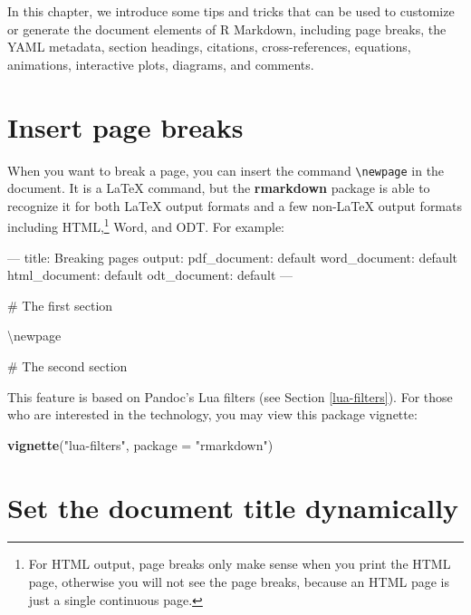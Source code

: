 \documentclass[
  11pt,
]{krantz}
\newenvironment{Shaded}{\begin{snugshade}}{\end{snugshade}}
\newcommand{\DataTypeTok}[1]{\textcolor[rgb]{0.27,0.27,0.27}{#1}}
\newcommand{\FunctionTok}[1]{\textcolor[rgb]{0,0,0}{#1}}
\newcommand{\KeywordTok}[1]{\textcolor[rgb]{0.27,0.27,0.27}{\textbf{#1}}}
\newcommand{\NormalTok}[1]{#1}
\newcommand{\StringTok}[1]{\textcolor[rgb]{0.5,0.5,0.5}{#1}}
\begin{document}
In this chapter, we introduce some tips and tricks that can be used to customize or generate the document elements of R Markdown, including page breaks, the YAML metadata, section headings, citations, cross-references, equations, animations, interactive plots, diagrams, and comments.

\hypertarget{pagebreaks}{%
\section{Insert page breaks}\label{pagebreaks}}

When you want to break a page, you can insert the command \texttt{\textbackslash{}newpage} in the document. It is a LaTeX command, but the \textbf{rmarkdown} package is able to recognize it for both LaTeX output formats and a few non-LaTeX output formats including HTML,\footnote{For HTML output, page breaks only make sense when you print the HTML page, otherwise you will not see the page breaks, because an HTML page is just a single continuous page.} Word, and ODT. For example:

\begin{Shaded}
\begin{Highlighting}[]
\NormalTok{---}
\NormalTok{title: Breaking pages}
\NormalTok{output:}
\NormalTok{  pdf_document: default}
\NormalTok{  word_document: default}
\NormalTok{  html_document: default}
\NormalTok{  odt_document: default}
\NormalTok{---}

\FunctionTok{# The first section}

\NormalTok{\textbackslash{}newpage}

\FunctionTok{# The second section}
\end{Highlighting}
\end{Shaded}

This feature is based on Pandoc's Lua filters (see Section \ref{lua-filters}). For those who are interested in the technology, you may view this package vignette:

\begin{Shaded}
\begin{Highlighting}[]
\KeywordTok{vignette}\NormalTok{(}\StringTok{"lua-filters"}\NormalTok{, }\DataTypeTok{package =} \StringTok{"rmarkdown"}\NormalTok{)}
\end{Highlighting}
\end{Shaded}

\hypertarget{dynamic-yaml}{%
\section{Set the document title dynamically}\label{dynamic-yaml}}
\end{document}
